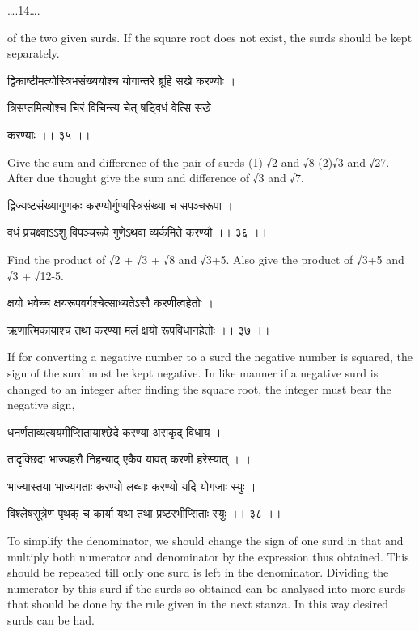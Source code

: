 \documentclass[]{article}
\date{}
\begin{document}
{\ldots{}.14\ldots{}.}

{of the two given surds. If the square root does not exist, the surds
should be kept separately.}

{द्विकाष्टीमत्योस्त्रिभसंख्ययोश्च योगान्तरे ब्रूहि सखे करण्योः । }

{त्रिसप्तमित्योश्च चिरं विचिन्त्य चेत् षड्विधं वेत्सि सखे }

{करण्याः ।। ३५ ।। }

{Give the sum and difference of the pair of surds (1) }{√}{2 and }{√}{8
(2)}{√}{3 and }{√}{27. After due thought give the sum and difference of
}{√}{3 and }{√}{7.}

{द्विज्यष्टसंख्यागुणकः करण्योर्गुण्यस्त्रिसंख्या च सपञ्चरूपा । }

{वधं प्रचक्ष्वाऽऽशु विपञ्चरूपे गुणेऽथवा व्यर्कमिते करण्यौ ।। ३६ ।। }

{Find the product of }{√}{2 + }{√}{3 + }{√}{8 and }{√}{3+5. Also give
the product of }{√}{3+5 and }{√}{3 + }{√}{12-5.}

{क्षयो भवेच्च क्षयरूपवर्गश्चेत्साध्यतेऽसौ करणीत्वहेतोः । }

{ऋणात्मिकायाश्च तथा करण्या मलं क्षयो रूपविधानहेतोः ।। ३७ ।। }

{If for converting a negative number to a surd the negative number is
squared, the sign of the surd must be kept negative. In like manner if a
negative surd is changed to an integer after finding the square root,
the integer must bear the negative sign,}

{धनर्णताव्यत्ययमीप्सितायाश्छेदे करण्या असकृद् विधाय । }

{तादृक्छिदा भाज्यहरौ निहन्याद् एकैव यावत् करणी हरेस्यात् । । }

{भाज्यास्तया भाज्यगताः करण्यो लब्धाः करण्यो यदि योगजाः स्युः । }

{विश्लेषसूत्रेण पृथक् च कार्या यथा तथा प्रष्टरभीप्सिताः स्युः ।। ३८ ।। }

{To simplify the denominator, we should change the sign of one surd in
that and multiply both numerator and denominator by the expression thus
obtained. This should be repeated till only one surd is left in the
denominator. Dividing the numerator by this surd if the surds so
obtained can be analysed into more surds that should be done by the rule
given in the next stanza. In this way desired surds can be had.\\
}
\end{document}
